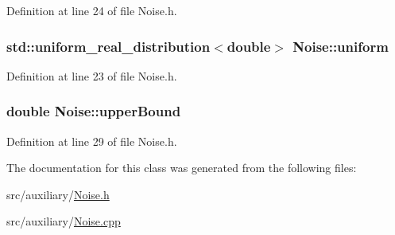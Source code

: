 Definition at line 24 of file Noise.\-h.

\hypertarget{class_noise_aa7025a1f6193c8cf2ce4d225b9f9413f}{
\subsubsection[{uniform}]{\setlength{\rightskip}{0pt plus 5cm}std\-::uniform\-\_\-real\-\_\-distribution$<$double$>$ Noise\-::uniform\hspace{0.3cm}{\ttfamily [protected]}}}\label{class_noise_aa7025a1f6193c8cf2ce4d225b9f9413f}


Definition at line 23 of file Noise.\-h.

\hypertarget{class_noise_ae4e9a84fa020eac595826a7a9a95bcb6}{
\subsubsection[{upper\-Bound}]{\setlength{\rightskip}{0pt plus 5cm}double Noise\-::upper\-Bound}}\label{class_noise_ae4e9a84fa020eac595826a7a9a95bcb6}


Definition at line 29 of file Noise.\-h.



The documentation for this class was generated from the following files\-:\begin{DoxyCompactItemize}
\item 
src/auxiliary/\hyperlink{_noise_8h}{Noise.\-h}\item 
src/auxiliary/\hyperlink{_noise_8cpp}{Noise.\-cpp}\end{DoxyCompactItemize}
